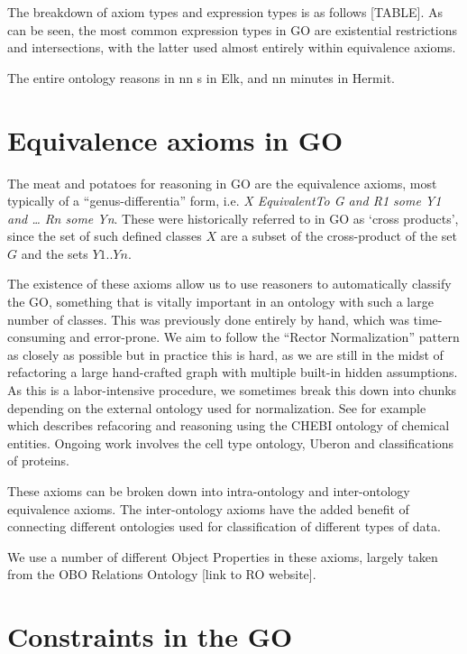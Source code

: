 \documentclass{llncs}
\begin{document}
The breakdown of axiom types and expression types is as follows
[TABLE]. As can be seen, the most common expression types in GO are
existential restrictions and intersections, with the latter used
almost entirely within equivalence axioms.

The entire ontology reasons in nn s in Elk\cite{Kazakov2014}, and nn
minutes in Hermit.

\section{Equivalence axioms in GO}

The meat and potatoes for reasoning in GO are the equivalence axioms,
most typically of a ``genus-differentia'' form, i.e. \emph{X
  EquivalentTo G and R1 some Y1 and … Rn some Yn}. These were
historically referred to in GO as ‘cross
products’\cite{Mungall2010GOXP}, since the set of such defined classes
$X$ are a subset of the cross-product of the set $G$ and the sets
$Y1..Yn$.

The existence of these axioms allow us to use reasoners to
automatically classify the GO, something that is vitally important in
an ontology with such a large number of classes. This was previously
done entirely by hand, which was time-consuming and error-prone. We
aim to follow the ``Rector Normalization''
pattern\cite{rector_modularisation_2003} as closely as possible but in
practice this is hard, as we are still in the midst of refactoring a
large hand-crafted graph with multiple built-in hidden assumptions. As
this is a labor-intensive procedure, we sometimes break this down into
chunks depending on the external ontology used for normalization. See
for example \cite{Hill2013} which describes refacoring and reasoning
using the CHEBI ontology of chemical entities. Ongoing work involves
the cell type ontology, Uberon and classifications of proteins.

These axioms can be broken down into intra-ontology and inter-ontology equivalence axioms. %
The inter-ontology axioms have the added benefit of connecting different ontologies used for classification of different types of data.

We use a number of different Object Properties in these axioms, largely taken from the OBO Relations Ontology [link to RO website].

\section{Constraints in the GO}
\end{document}
